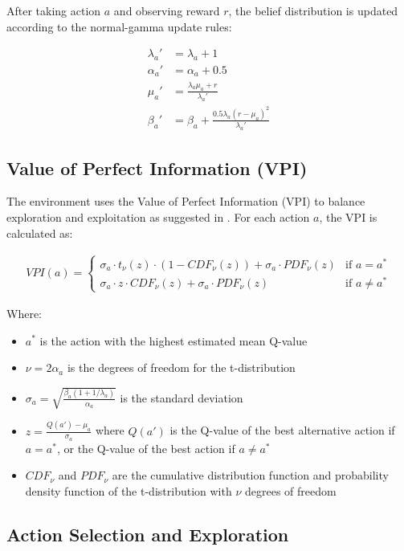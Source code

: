 After taking action $a$ and observing reward $r$, the belief distribution is updated according to the normal-gamma update rules:

\begin{align}
\lambda_{a}' &= \lambda_{a} + 1\\
\alpha_{a}' &= \alpha_{a} + 0.5\\
\mu_{a}' &= \frac{\lambda_{a} \mu_{a} + r}{\lambda_{a}'}\\
\beta_{a}' &= \beta_{a} + \frac{0.5 \lambda_{a} (r - \mu_{a})^2}{\lambda_{a}'}
\end{align}

\subsection{Value of Perfect Information (VPI)}
The environment uses the Value of Perfect Information (VPI) to balance exploration and exploitation as suggested in \cite{matthews2012}. For each action $a$, the VPI is calculated as:

\begin{align}
VPI(a) = \begin{cases}
\sigma_a \cdot t_{\nu}(z) \cdot (1 - CDF_{\nu}(z)) + \sigma_a \cdot PDF_{\nu}(z) & \text{if } a = a^*\\
\sigma_a \cdot z \cdot CDF_{\nu}(z) + \sigma_a \cdot PDF_{\nu}(z) & \text{if } a \neq a^*
\end{cases}
\end{align}

Where:
\begin{itemize}
    \item $a^*$ is the action with the highest estimated mean Q-value
    \item $\nu = 2\alpha_a$ is the degrees of freedom for the t-distribution
    \item $\sigma_a = \sqrt{\frac{\beta_a(1+1/\lambda_a)}{\alpha_a}}$ is the standard deviation
    \item $z = \frac{Q(a') - \mu_a}{\sigma_a}$ where $Q(a')$ is the Q-value of the best alternative action if $a = a^*$, or the Q-value of the best action if $a \neq a^*$
    \item $CDF_{\nu}$ and $PDF_{\nu}$ are the cumulative distribution function and probability density function of the t-distribution with $\nu$ degrees of freedom
\end{itemize}

\subsection{Action Selection and Exploration}

